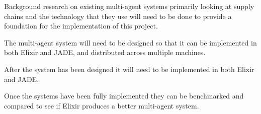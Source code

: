 \begin{description}[style=nextline]
    \item [Literature Review] Background research on existing multi-agent systems primarily looking at supply chains and the technology that they use will need to be done to provide a foundation for the implementation of this project.
    \item [System Design] The multi-agent system will need to be designed so that it can be implemented in both Elixir and JADE, and distributed across multiple machines\@.
    \item [Implementation] After the system has been designed it will need to be implemented in both Elixir and JADE\@.
    \item [Analysis] Once the systems have been fully implemented they can be benchmarked and compared to see if Elixir produces a better multi-agent system.
\end{description}
